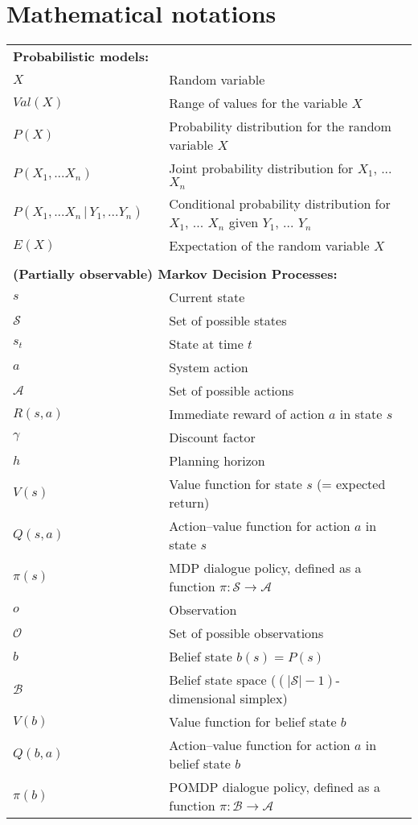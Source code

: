 
\chapter*{Mathematical notations}
\thispagestyle{empty}

\begin{longtable}{lp{5mm}p{11cm}}
\multicolumn{3}{l}{\textbf{Probabilistic models:}} \vspace{2mm} \\
$X$ && Random variable \\
$Val(X)$ && Range of values for the variable $X$ \\
$P(X)$ && Probability distribution for the random variable $X$ \\
$P(X_1, ...X_n)$ && Joint probability distribution for $X_1$, ... $X_n$ \\
$P(X_1,...X_n \, | \, Y_1, ... Y_n)$ && Conditional probability distribution for $X_1$, ... $X_n$ given $Y_1$, ... $Y_n$  \\ 
$E(X)$ && Expectation of the random variable $X$ \\
&&  \vspace{3mm} \\
\multicolumn{3}{l}{\textbf{(Partially observable) Markov Decision Processes:}} \vspace{2mm} \\
$s$ && Current state \\
$\mathcal{S}$ && Set of possible states \\
$s_t$ && State at time $t$ \\
$a$ && System action \\ 
$\mathcal{A}$ && Set of possible actions \\
$R(s,a)$ && Immediate reward of action $a$ in state $s$ \\
$\gamma$ && Discount factor \\
$h$ && Planning horizon \\
$V(s)$ && Value function for state $s$ (= expected return) \\
$Q(s,a)$ && Action--value function for action $a$ in state $s$  \\
$\pi(s)$ && MDP dialogue policy, defined as a function $\pi: \mathcal{S} \rightarrow \mathcal{A} $ \\
$o$ && Observation \\
$\mathcal{O}$ && Set of possible observations \\
$b$ && Belief state $b(s) = P(s)$ \\
$\mathcal{B}$ && Belief state space  ($(|\mathcal{S}|\!-\!1)$-dimensional simplex) \\
$V(b)$ && Value function for belief state $b$  \\
$Q(b,a)$ && Action--value function for action $a$ in belief state $b$ \\
$\pi(b)$ && POMDP dialogue policy, defined as a function $\pi: \mathcal{B} \rightarrow \mathcal{A} $ \\


\end{longtable}

